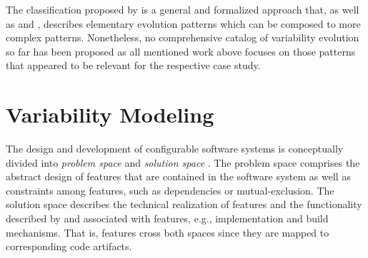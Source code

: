 The classification proposed by \cite{peng_analyzing_2011} is a general and formalized approach
that, as well as \cite{seidl_co-evolution_2012} and \cite{passos_towards_2012}, describes
elementary evolution patterns which can be composed to more complex patterns. Nonetheless, no
comprehensive catalog of variability evolution so far has been proposed as all
mentioned work above focuses on those patterns that appeared to be relevant for
the respective case study.

\section{Variability Modeling}
{\color{violet}
The design and development of configurable software systems is conceptually
divided into \emph{problem space} and \emph{solution space} \citep{czarnecki_generative_2000}. The problem space
comprises the abstract design of features that are contained in the software system as well as
constraints among features, such as dependencies or mutual-exclusion. The
solution space describes the technical realization of features and the
functionality described by and associated with features, e.g., implementation
and build mechanisms. That is, features cross both spaces since they are mapped
to corresponding code artifacts.

}
